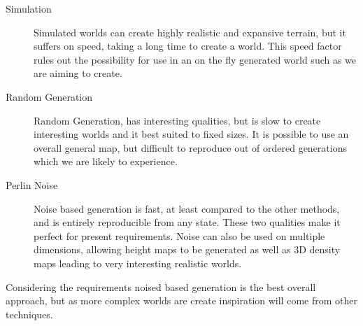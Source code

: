 \begin{description}
\item[Simulation]
Simulated worlds can create highly realistic
and expansive terrain, but it suffers on speed, taking a long time to create a 
world. This speed factor rules out the possibility for use in an on the fly 
generated world such as we are aiming to create. 

\item[Random Generation] Random Generation, has 
interesting qualities, but is slow to create interesting worlds and it best
suited to fixed sizes. It is possible to use an overall general map, but 
difficult to reproduce out of ordered generations which we are likely to
experience. 

\item[Perlin Noise] Noise based generation is fast, at least compared to the other
methods, and is entirely reproducible from any state. These two qualities make it
perfect for present requirements. Noise can also be used on multiple dimensions, 
allowing height maps to be generated as well as 3D density maps leading to very
interesting realistic worlds.
\end{description}

Considering the requirements noised based generation is the best overall 
approach,
but as more complex worlds are create inspiration will come from other 
techniques.\\
